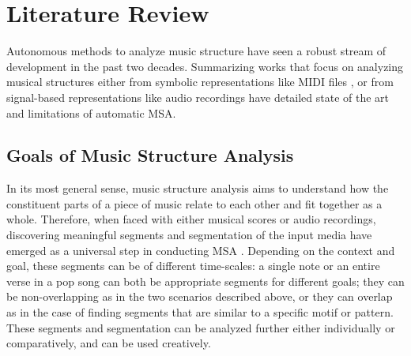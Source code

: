 \section{Literature Review}
Autonomous methods to analyze music structure have seen a robust stream of development in the past two decades.
Summarizing works that focus on analyzing musical structures either from symbolic representations like MIDI files \citep{janssen2013discovering}, or from signal-based representations like audio recordings \citep{nieto2020structure, nieto2015, paulus2010audio} have detailed state of the art and limitations of automatic MSA.

\subsection{Goals of Music Structure Analysis}
In its most general sense, music structure analysis aims to understand how the constituent parts of a piece of music relate to each other and fit together as a whole.
Therefore, when faced with either musical scores or audio recordings, discovering meaningful segments and segmentation of the input media have emerged as a universal step in conducting MSA \citep{janssen2013discovering, nieto2020structure}.
Depending on the context and goal, these segments can be of different time-scales: a single note or an entire verse in a pop song can both be appropriate segments for different goals; they can be non-overlapping as in the two scenarios described above, or they can overlap as in the case of finding segments that are similar to a specific motif or pattern.
These segments and segmentation can be analyzed further either individually or comparatively, and can be used creatively.

